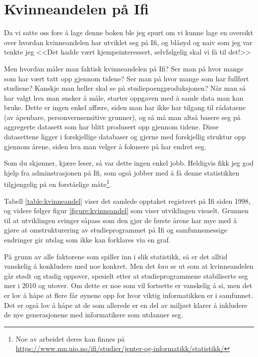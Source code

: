 \chapter{Kvinneandelen på Ifi}

\label{chap:kvinneandelen}

\author{Skrevet av Arne Hassel, med god hjelp fra administrasjonen på Ifi ved Eli Berge}

Da vi satte oss fore å lage denne boken ble jeg spurt om vi kunne lage en oversikt over hvordan kvinneandelen har utviklet seg på Ifi, og blåøyd og naiv som jeg var tenkte jeg <<Det hadde vært kjempeinteressert, selvfølgelig skal vi få til det!>> 

Men hvordan måler man faktisk kvinneandelen på Ifi? Ser man på hvor mange som har vært tatt opp gjennom tidene? Ser man på hvor mange som har fullført studiene? Kanskje man heller skal se på studiepoengproduksjonen? Når man så har valgt hva man ønsker å måle, starter oppgaven med å samle data man kan bruke. Dette er ingen enkel affære, siden man har ikke har tilgang til rådataene (av åpenbare, personvernsensitive grunner), og så må man altså basere seg på aggregerte datasett som har blitt produsert opp gjennom tidene. Disse datasettene ligger i forskjellige databaser og gjerne med forskjellig struktur opp gjennom årene, siden hva man velger å fokusere på har endret seg.

Som du skjønner, kjære leser, så var dette ingen enkel jobb. Heldigvis fikk jeg god hjelp fra adminstrasjonen på Ifi, som også jobber med å få denne statistikken tilgjengelig på en forståelige måte\footnote{Noe av arbeidet deres kan finnes på \url{https://www.mn.uio.no/ifi/studier/jenter-og-informatikk/statistikk/}}.

Tabell \ref{table:kvinneandel} viser det samlede opptaket registrert på Ifi siden 1998, og videre følger figur \ref{figure:kvinneandel} som viser utviklingen visuelt. Grunnen til at utviklingen svinger såpass som den gjør de første årene har mye med å gjøre at omstrukturering av studieprogrammet på Ifi og samfunnsmessige endringer gir utslag som ikke kan forklares via en graf.

På grunn av alle faktorene som spiller inn i slik statistikk, så er det alltid vanskelig å konkludere med noe konkret. Men det \textit{kan} se ut som at kvinneandelen går stødt og stadig oppover, spesielt etter at studieprogrammene stabiliserte seg mer i 2010 og utover. Om dette er noe som vil fortsette er vanskelig å si, men det er lov å håpe at flere får øynene opp for hvor viktig informatikken er i samfunnet. Det er også lov å håpe at de som allerede er en del av miljøet klarer å inkludere de nye generasjonene med informatikere som utdanner seg.

